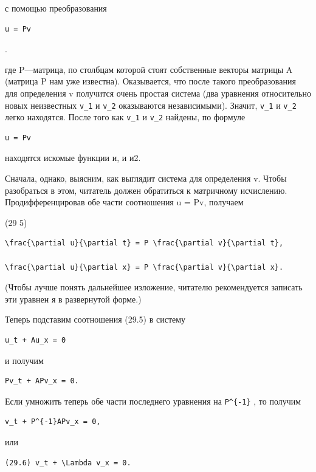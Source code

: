 \documentclass[
  ukrainian,
]{article}
\begin{document}
с помощью преобразования

\begin{verbatim}
u = Pv
\end{verbatim}

.

где P---матрица, по столбцам которой стоят собственные векторы матрицы A
(матрица P нам уже известна). Оказывается, что после такого
преобразования для определения v получится очень простая система (два
уравнения относительно новых неизвестных \texttt{v\_1} и \texttt{v\_2}
оказываются независимыми). Значит, \texttt{v\_1} и \texttt{v\_2} легко
находятся. После того как \texttt{v\_1} и \texttt{v\_2} найдены, по
формуле

\begin{verbatim}
u = Pv
\end{verbatim}

находятся искомые функции и, и и2.

Сначала, однако, выясним, как выглядит система для определения v. Чтобы
разобраться в этом, читатель должен обратиться к матричному исчислению.
Продифференцировав обе части соотношения u = Pv, получаем

(29 5)

\begin{verbatim}
\frac{\partial u}{\partial t} = P \frac{\partial v}{\partial t},

\frac{\partial u}{\partial x} = P \frac{\partial v}{\partial x}.
\end{verbatim}

(Чтобы лучше понять дальнейшее изложение, читателю рекомендуется
записать эти уравнен я в развернутой форме.)

Теперь подставим соотношения (29.5) в систему

\begin{verbatim}
u_t + Au_x = 0
\end{verbatim}

и получим

\begin{verbatim}
Pv_t + APv_x = 0.
\end{verbatim}

Если умножить теперь обе части последнего уравнения на
\texttt{P\^{}\{-1\}} , то получим

\begin{verbatim}
v_t + P^{-1}APv_x = 0,
\end{verbatim}

или

\begin{verbatim}
(29.6) v_t + \Lambda v_x = 0.
\end{verbatim}
\end{document}
